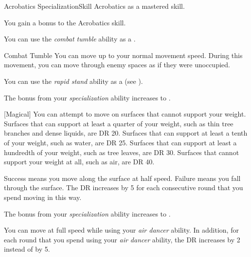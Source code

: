     \begin{feat}{Acrobatics Specialization}{Skill}
        \featpre Acrobatics as a mastered skill.

         You gain a  bonus to the Acrobatics skill.

         You can use the \textit{combat tumble} ability as a .
        \begin{apability}{Combat Tumble}
            You can move up to your normal movement speed.
            During this movement, you can move through enemy spaces as if they were unoccupied.
        \end{apability}

         You can use the \textit{rapid stand} ability as a  (see ).

         The bonus from your \textit{specialization} ability increases to .

        [Magical] You can attempt to move on surfaces that cannot support your weight.
        Surfaces that can support at least a quarter of your weight, such as thin tree branches and dense liquids, are DR 20.
        Surfaces that can support at least a tenth of your weight, such as water, are DR 25.
        Surfaces that can support at least a hundredth of your weight, such as tree leaves, are DR 30.
        Surfaces that cannot support your weight at all, such as air, are DR 40.

        Success means you move along the surface at half speed.
        Failure means you fall through the surface.
        The DR increases by 5 for each consecutive round that you spend moving in this way.

         The bonus from your \textit{specialization} ability increases to .

         You can move at full speed while using your \textit{air dancer} ability.
        In addition, for each round that you spend using your \textit{air dancer} ability, the DR increases by 2 instead of by 5.
    \end{feat}


